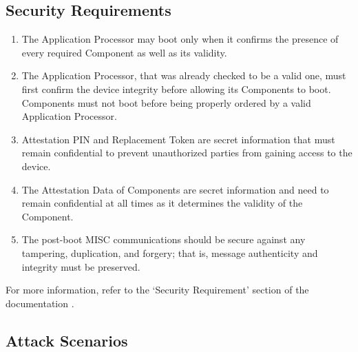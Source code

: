 

\subsection{Security Requirements}
\label{sec:SR}

\begin{enumerate}[label={\textbf{(SR\arabic*)}}, leftmargin=0.55in]
\item The Application Processor may boot only when it confirms the presence of every required Component as well as its validity.

\item The Application Processor, that was already checked to be a valid one, must first confirm the device integrity before allowing its Components to boot. Components must not boot before being properly ordered by a valid Application Processor. 

\item Attestation PIN and Replacement Token are secret information that must remain confidential to prevent unauthorized parties from gaining access to the device.

\item The Attestation Data of Components are secret information and need to remain confidential at all times as it determines the validity of the Component. 

\item The post-boot MISC communications should be secure against any tampering, duplication, and forgery; that is, message authenticity and integrity must be preserved. 
\end{enumerate}

For more information, refer to the `Security Requirement' section of the documentation \cite{eCTFOfficial}.

\subsection{Attack Scenarios}
\label{sec:AS}

